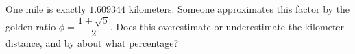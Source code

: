 One mile is exactly $1.609344$ kilometers. Someone approximates this factor by the golden ratio $\phi=\dfrac{1+\sqrt5}{2}$. Does this overestimate or underestimate the kilometer distance, and by about what percentage?
